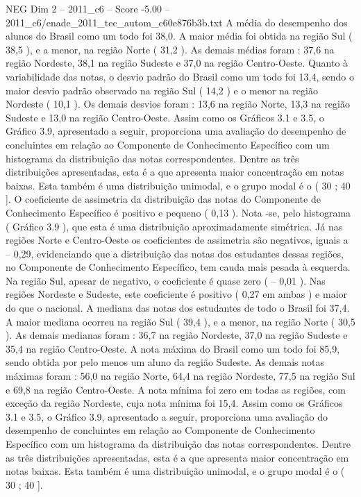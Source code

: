 \begin{textsample}{NEG Dim 2 – 2011\_c6 – Score -5.00 – 2011\_c6/enade\_2011\_tec\_autom\_c60e876b3b.txt}
A média do desempenho dos alunos do Brasil como um todo foi 38,0.
A maior média foi obtida na região Sul ( 38,5 ), e a menor, na região Norte ( 31,2 ).
As demais médias foram : 37,6 na região Nordeste, 38,1 na região Sudeste e 37,0 na região Centro-Oeste.
Quanto à variabilidade das notas, o desvio padrão do Brasil como um todo foi 13,4, sendo o maior desvio padrão observado na região Sul ( 14,2 ) e o menor na região Nordeste ( 10,1 ).
Os demais desvios foram : 13,6 na região Norte, 13,3 na região Sudeste e 13,0 na região Centro-Oeste.
Assim como os Gráficos 3.1 e 3.5, o Gráfico 3.9, apresentado a seguir, proporciona uma avaliação do desempenho de concluintes em relação ao Componente de Conhecimento Específico com um histograma da distribuição das notas correspondentes.
Dentre as três distribuições apresentadas, esta é a que apresenta maior concentração em notas baixas.
Esta também é uma distribuição unimodal, e o grupo modal é o ( 30 ; 40 ].
O coeficiente de assimetria da distribuição das notas do Componente de Conhecimento Específico é positivo e pequeno ( 0,13 ).
Nota -se, pelo histograma ( Gráfico 3.9 ), que esta é uma distribuição aproximadamente simétrica.
Já nas regiões Norte e Centro-Oeste os coeficientes de assimetria são negativos, iguais a – 0,29, evidenciando que a distribuição das notas dos estudantes dessas regiões, no Componente de Conhecimento Específico, tem cauda mais pesada à esquerda.
Na região Sul, apesar de negativo, o coeficiente é quase zero ( – 0,01 ).
Nas regiões Nordeste e Sudeste, este coeficiente é positivo ( 0,27 em ambas ) e maior do que o nacional.
A mediana das notas dos estudantes de todo o Brasil foi 37,4.
A maior mediana ocorreu na região Sul ( 39,4 ), e a menor, na região Norte ( 30,5 ).
As demais medianas foram : 36,7 na região Nordeste, 37,0 na região Sudeste e 35,4 na região Centro-Oeste.
A nota máxima do Brasil como um todo foi 85,9, sendo obtida por pelo menos um aluno da região Sudeste.
As demais notas máximas foram : 56,0 na região Norte, 64,4 na região Nordeste, 77,5 na região Sul e 69,8 na região Centro-Oeste.
A nota mínima foi zero em todas as regiões, com exceção da região Nordeste, cuja nota mínima foi 15,4.
Assim como os Gráficos 3.1 e 3.5, o Gráfico 3.9, apresentado a seguir, proporciona uma avaliação do desempenho de concluintes em relação ao Componente de Conhecimento Específico com um histograma da distribuição das notas correspondentes.
Dentre as três distribuições apresentadas, esta é a que apresenta maior concentração em notas baixas.
Esta também é uma distribuição unimodal, e o grupo modal é o ( 30 ; 40 ].

\end{textsample}
